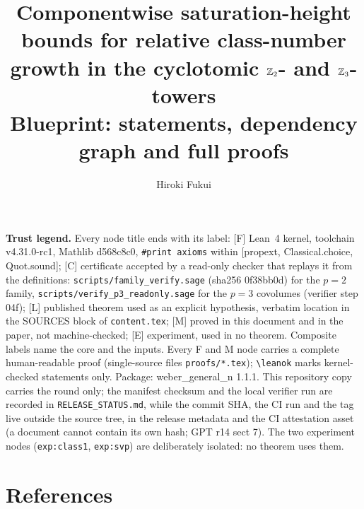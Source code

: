 \documentclass[11pt]{report}
\title{Componentwise saturation-height bounds for relative class-number growth in the cyclotomic $\mathbb{Z}_2$- and $\mathbb{Z}_3$-towers\\[1ex]\large Blueprint: statements, dependency graph and full proofs}
\author{Hiroki Fukui}
\begin{document}
\maketitle
\noindent\textbf{Trust legend.} Every node title ends with its label: [F] Lean~4 kernel, toolchain v4.31.0-rc1, Mathlib d568c8c0, \texttt{\#print axioms} within [propext, Classical.choice, Quot.sound]; [C] certificate accepted by a read-only checker that replays it from the definitions: \texttt{scripts/\allowbreak family\_verify.sage} (sha256 0f38bb0d) for the $p=2$ family, \texttt{scripts/\allowbreak verify\_p3\_readonly.sage} for the $p=3$ covolumes (verifier step 04f); [L] published theorem used as an explicit hypothesis, verbatim location in the SOURCES block of \texttt{content.tex}; [M] proved in this document and in the paper, not machine-checked; [E] experiment, used in no theorem. Composite labels name the core and the inputs. Every F and M node carries a complete human-readable proof (single-source files \texttt{proofs/*.tex}); \texttt{\textbackslash leanok} marks kernel-checked statements only. Package: weber\_general\_n 1.1.1. This repository copy carries the round only; the manifest checksum and the local verifier run are recorded in \texttt{RELEASE\_STATUS.md}, while the commit SHA, the CI run and the tag live outside the source tree, in the release metadata and the CI attestation asset (a document cannot contain its own hash; GPT r14 sect 7). The two experiment nodes (\texttt{exp:class1}, \texttt{exp:svp}) are deliberately isolated: no theorem uses them.
\tableofcontents

\chapter*{References}

\end{document}
